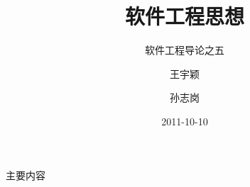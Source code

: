 
\graphicspath{{./thinking_in_se/}}

\title[Thinking in SE]
{软件工程思想}

\subtitle
{软件工程导论之五} %

\author[\url{http://sunner.cn}] %
{王宇颖 \and 孙志岗}


\date[Short Occasion] %
{2011-10-10}

\subject{Slides}














\begin{frame}
  \titlepage
\end{frame}

\begin{frame}{主要内容}
  \tableofcontents
\end{frame}



